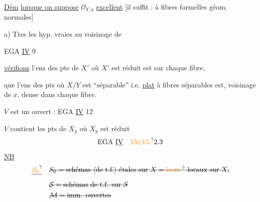 \uline{Dém} \uline{lorsque on suppose} $\mathcal O_{Y,y}$ \uline{excellent} [il suffit : à fibres formelles géom. normales]

a) Ttes les hyp.   vraies au voisinage  de 

EGA \uline{IV} 9

\uline{vérifions} l'ens des pts de $X'$ où $X'$ est réduit est  sur chaque fibre,

 que l'ens  des pts où $X/Y$ est  ``séparable'' i.e. \uline{plat} à fibres séparables est,  voisinage de $x$, dense dans chaque fibre.

$V$ est un ouvert : EGA \uline{IV} 12

$V$ contient les pts de $X_y$ où $X_y$ est réduit
\[
\text{EGA }\underline{\mathrm{IV}}\quad \unsure{15\text{r}|15.}2.3
\]
\uline{NB} 
\[
\begin{aligned}
\deleted{\unsure{S_0}}&\quad\deleted{S_0=\text{schémas \inserted{de t.f.} étales sur }X=\text{\unsure{isom.} locaux sur }X,}\\
&\quad\deleted{\mathcal S=\text{schémas de t.f. sur }S}\\
&\quad\deleted{\mathcal M=\text{imm. ouvertes}}
\end{aligned}
\]

